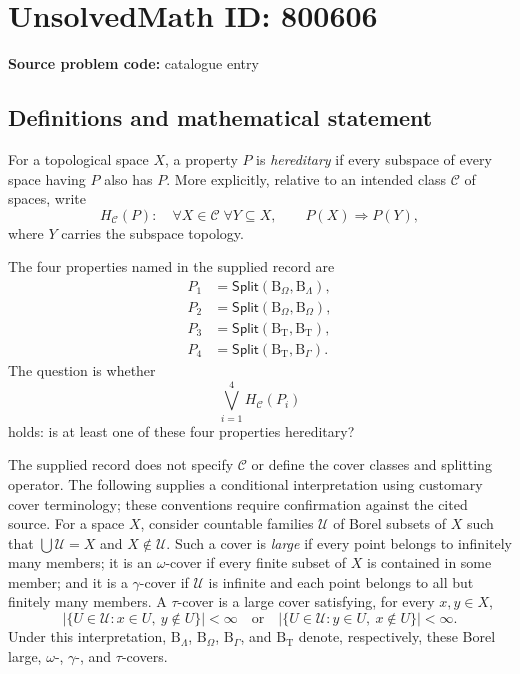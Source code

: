 \documentclass[11pt]{article}
\begin{document}
\section*{UnsolvedMath ID: 800606}
\textbf{Source problem code:} catalogue entry
\subsection{Definitions and mathematical statement}
For a topological space \(X\), a property \(P\) is \emph{hereditary} if every subspace of every space having \(P\) also has \(P\). More explicitly, relative to an intended class \(\mathcal C\) of spaces, write
\[
H_{\mathcal C}(P):\quad
\forall X\in\mathcal C\;\forall Y\subseteq X,
\qquad P(X)\Longrightarrow P(Y),
\]
where \(Y\) carries the subspace topology.

The four properties named in the supplied record are
\[
\begin{aligned}
P_1&=\mathsf{Split}(\mathrm{B}_{\Omega},\mathrm{B}_{\Lambda}),\\
P_2&=\mathsf{Split}(\mathrm{B}_{\Omega},\mathrm{B}_{\Omega}),\\
P_3&=\mathsf{Split}(\mathrm{B}_{\mathrm{T}},\mathrm{B}_{\mathrm{T}}),\\
P_4&=\mathsf{Split}(\mathrm{B}_{\mathrm{T}},\mathrm{B}_{\Gamma}).
\end{aligned}
\]
The question is whether
\[
\bigvee_{i=1}^{4}H_{\mathcal C}(P_i)
\]
holds: is at least one of these four properties hereditary?

The supplied record does not specify \(\mathcal C\) or define the cover classes and splitting operator. The following supplies a conditional interpretation using customary cover terminology; these conventions require confirmation against the cited source. For a space \(X\), consider countable families \(\mathcal U\) of Borel subsets of \(X\) such that \(\bigcup\mathcal U=X\) and \(X\notin\mathcal U\). Such a cover is \emph{large} if every point belongs to infinitely many members; it is an \(\omega\)-cover if every finite subset of \(X\) is contained in some member; and it is a \(\gamma\)-cover if \(\mathcal U\) is infinite and each point belongs to all but finitely many members. A \(\tau\)-cover is a large cover satisfying, for every \(x,y\in X\),
\[
\bigl|\{U\in\mathcal U:x\in U,\ y\notin U\}\bigr|<\infty
\quad\text{or}\quad
\bigl|\{U\in\mathcal U:y\in U,\ x\notin U\}\bigr|<\infty.
\]
Under this interpretation, \(\mathrm{B}_{\Lambda}\), \(\mathrm{B}_{\Omega}\), \(\mathrm{B}_{\Gamma}\), and \(\mathrm{B}_{\mathrm{T}}\) denote, respectively, these Borel large, \(\omega\)-, \(\gamma\)-, and \(\tau\)-covers.
\end{document}
